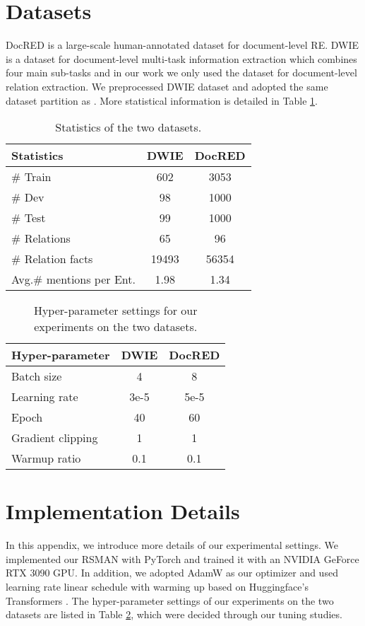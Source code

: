 \documentclass[11pt]{article}
\begin{document}
\section{Datasets}\label{sec:data}
DocRED is a large-scale human-annotated dataset for document-level RE. DWIE is a dataset for document-level multi-task information extraction which combines four main sub-tasks and in our work we only used the dataset for document-level relation extraction. 
We preprocessed DWIE dataset and adopted the same dataset partition as \cite{ru-etal-2021-learning}. More statistical information is detailed in Table \ref{tab:statistics}.
\begin{table}[htbp]
  \centering
    \begin{tabular}{lcc}
    \toprule
    Statistics & \multicolumn{1}{l}{DWIE} & \multicolumn{1}{l}{ DocRED} \\
    \midrule
    \# Train & 602   & 3053 \\
    \# Dev & 98    & 1000 \\
    \# Test & 99    & 1000 \\
    \# Relations & 65    & 96 \\
    \# Relation facts & 19493 & 56354 \\
    Avg.\# mentions per Ent. & 1.98  & 1.34 \\
    \bottomrule
    \end{tabular}\caption{Statistics of the two datasets.}
  \label{tab:statistics}\end{table}

\begin{table}[htbp]
  \centering
    \begin{tabular}{lcc}
    \toprule
    Hyper-parameter & \multicolumn{1}{l}{DWIE} & \multicolumn{1}{l}{ DocRED} \\
    \midrule
    Batch size & 4     & 8 \\
    Learning rate & {3e-5} & {5e-5} \\
    Epoch & 40    & 60 \\
    Gradient clipping & 1     & 1 \\
    Warmup ratio & 0.1   & 0.1 \\
    \bottomrule
    \end{tabular}\caption{Hyper-parameter settings for our experiments on the two datasets.}
  \label{parameter}\end{table}

\section{Implementation Details}
\label{sec:details}

In this appendix, we introduce more details of our experimental settings. We implemented our RSMAN with PyTorch and trained it with an NVIDIA GeForce RTX 3090 GPU. In addition, we adopted AdamW \cite{loshchilov2018decoupled} as our optimizer and used learning rate linear schedule with warming up based on Huggingface’s Transformers \cite{wolf2019huggingface}.
The hyper-parameter settings of our experiments on the two datasets are listed in Table \ref{parameter}, which were decided through our tuning studies.
\end{document}
